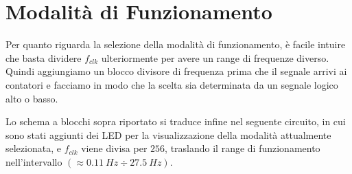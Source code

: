 \chapter{Modalità di Funzionamento}


Per quanto riguarda la selezione della modalità di funzionamento, è facile intuire che basta
dividere $f_{clk}$ ulteriormente per avere un range di frequenze diverso. Quindi aggiungiamo
un blocco divisore di frequenza prima che il segnale arrivi ai contatori e facciamo in modo
che la scelta sia determinata da un segnale logico alto o basso.


Lo schema a blocchi sopra riportato si traduce infine nel seguente circuito, in cui sono
stati aggiunti dei LED per la visualizzazione della modalità attualmente selezionata, e $f_{clk}$
viene divisa per $256$, traslando il range di funzionamento nell'intervallo
$(\approx0.11\ Hz\div27.5\ Hz)$.



